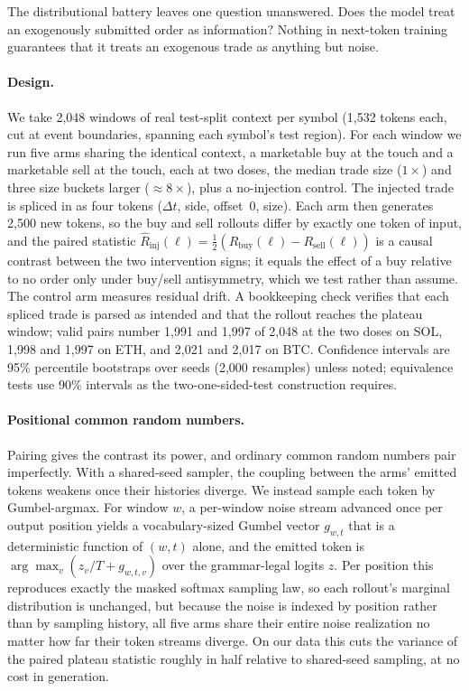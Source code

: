 \documentclass[sigconf,anonymous]{acmart}
\begin{document}
The distributional battery leaves one question unanswered. Does the model treat an exogenously submitted order as information? Nothing in next-token training guarantees that it treats an exogenous trade as anything but noise.

\paragraph{Design.} We take 2{,}048 windows of real test-split context per symbol (1,532 tokens each, cut at event boundaries, spanning each symbol's test region). For each window we run five arms sharing the identical context, a marketable buy at the touch and a marketable sell at the touch, each at two doses, the median trade size ($1\times$) and three size buckets larger ($\approx 8\times$), plus a no-injection control. The injected trade is spliced in as four tokens ($\Delta t$, side, offset~0, size). Each arm then generates 2,500 new tokens, so the buy and sell rollouts differ by exactly one token of input, and the paired statistic $\hat{R}_{\mathrm{inj}}(\ell) = \tfrac{1}{2}(R_{\mathrm{buy}}(\ell) - R_{\mathrm{sell}}(\ell))$ is a causal contrast between the two intervention signs; it equals the effect of a buy relative to no order only under buy/sell antisymmetry, which we test rather than assume. The control arm measures residual drift. A bookkeeping check verifies that each spliced trade is parsed as intended and that the rollout reaches the plateau window; valid pairs number 1{,}991 and 1{,}997 of 2{,}048 at the two doses on SOL, 1{,}998 and 1{,}997 on ETH, and 2{,}021 and 2{,}017 on BTC. Confidence intervals are 95\% percentile bootstraps over seeds (2{,}000 resamples) unless noted; equivalence tests use 90\% intervals as the two-one-sided-test construction requires.

\paragraph{Positional common random numbers.} Pairing gives the contrast its power, and ordinary common random numbers pair imperfectly. With a shared-seed sampler, the coupling between the arms' emitted tokens weakens once their histories diverge. We instead sample each token by Gumbel-argmax. For window $w$, a per-window noise stream advanced once per output position yields a vocabulary-sized Gumbel vector $g_{w,t}$ that is a deterministic function of $(w,t)$ alone, and the emitted token is $\arg\max_v (z_v/T + g_{w,t,v})$ over the grammar-legal logits $z$. Per position this reproduces exactly the masked softmax sampling law, so each rollout's marginal distribution is unchanged, but because the noise is indexed by position rather than by sampling history, all five arms share their entire noise realization no matter how far their token streams diverge. On our data this cuts the variance of the paired plateau statistic roughly in half relative to shared-seed sampling, at no cost in generation.
\end{document}
